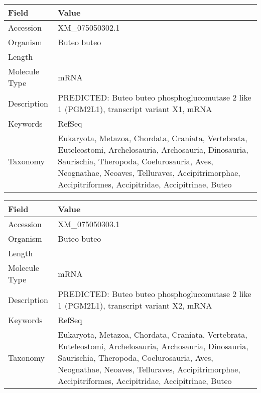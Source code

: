 \documentclass[10pt]{article}
\begin{document}
\vspace{1em}
{\footnotesize
\begin{longtable}{>{\raggedright\arraybackslash}p{4.5cm} >{\raggedright\arraybackslash}p{11.5cm}}
\textbf{Field} & \textbf{Value} \\
\hline
Accession & XM\_075050302.1 \\
Organism & Buteo buteo \\
Length & 6441 \\
Molecule Type & mRNA \\
Description & PREDICTED: Buteo buteo phosphoglucomutase 2 like 1 (PGM2L1), transcript variant X1, mRNA \\
Keywords & RefSeq \\
Taxonomy & Eukaryota, Metazoa, Chordata, Craniata, Vertebrata, Euteleostomi, Archelosauria, Archosauria, Dinosauria, Saurischia, Theropoda, Coelurosauria, Aves, Neognathae, Neoaves, Telluraves, Accipitrimorphae, Accipitriformes, Accipitridae, Accipitrinae, Buteo \\
\end{longtable}
}

\vspace{1em}
{\footnotesize
\begin{longtable}{>{\raggedright\arraybackslash}p{4.5cm} >{\raggedright\arraybackslash}p{11.5cm}}
\textbf{Field} & \textbf{Value} \\
\hline
Accession & XM\_075050303.1 \\
Organism & Buteo buteo \\
Length & 6220 \\
Molecule Type & mRNA \\
Description & PREDICTED: Buteo buteo phosphoglucomutase 2 like 1 (PGM2L1), transcript variant X2, mRNA \\
Keywords & RefSeq \\
Taxonomy & Eukaryota, Metazoa, Chordata, Craniata, Vertebrata, Euteleostomi, Archelosauria, Archosauria, Dinosauria, Saurischia, Theropoda, Coelurosauria, Aves, Neognathae, Neoaves, Telluraves, Accipitrimorphae, Accipitriformes, Accipitridae, Accipitrinae, Buteo \\
\end{longtable}
}
\end{document}
